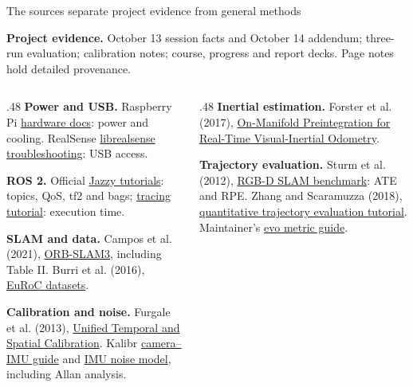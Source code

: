 \documentclass[aspectratio=169,12pt,t]{beamer}
\begin{document}
\begin{frame}{The sources separate project evidence from general methods}

{\small
\textbf{Project evidence.} October 13 session facts and October 14 addendum; three-run evaluation; calibration notes; course, progress and report decks. Page notes hold detailed provenance.\par\medskip
\begin{columns}[T,onlytextwidth]
\begin{column}{.48\textwidth}
\textbf{Power and USB.} Raspberry Pi \href{https://www.raspberrypi.com/documentation/computers/raspberry-pi.html}{hardware docs}: power and cooling. RealSense \href{https://github.com/realsenseai/librealsense/wiki/Troubleshooting-Q\%26A}{librealsense troubleshooting}: USB access.\par\medskip
\textbf{ROS 2.} Official \href{https://docs.ros.org/en/jazzy/Tutorials.html}{Jazzy tutorials}: topics, QoS, tf2 and bags; \href{https://docs.ros.org/en/jazzy/Tutorials/Advanced/ROS2-Tracing-Trace-and-Analyze.html}{tracing tutorial}: execution time.\par\medskip
\textbf{SLAM and data.} Campos et al. (2021), \href{https://arxiv.org/abs/2007.11898}{ORB-SLAM3}, including Table II. Burri et al. (2016), \href{https://projects.asl.ethz.ch/datasets/doku.php?id=kmavvisualinertialdatasets}{EuRoC datasets}.\par\medskip
\textbf{Calibration and noise.} Furgale et al. (2013), \href{https://github.com/ethz-asl/kalibr/wiki}{Unified Temporal and Spatial Calibration}. Kalibr \href{https://github.com/ethz-asl/kalibr/wiki/camera-imu-calibration}{camera--IMU guide} and \href{https://github.com/ethz-asl/kalibr/wiki/IMU-Noise-Model}{IMU noise model}, including Allan analysis.\par
\end{column}
\begin{column}{.48\textwidth}
\textbf{Inertial estimation.} Forster et al. (2017), \href{https://arxiv.org/abs/1512.02363}{On-Manifold Preintegration for Real-Time Visual-Inertial Odometry}.\par\medskip
\textbf{Trajectory evaluation.} Sturm et al. (2012), \href{https://cvg.cit.tum.de/data/datasets/rgbd-dataset}{RGB-D SLAM benchmark}: ATE and RPE. Zhang and Scaramuzza (2018), \href{https://rpg.ifi.uzh.ch/docs/IROS18_Zhang.pdf}{quantitative trajectory evaluation tutorial}. Maintainer's \href{https://github.com/MichaelGrupp/evo/wiki/Metrics}{evo metric guide}.\par\medskip

\end{column}
\end{columns}}
\end{frame}
\end{document}
